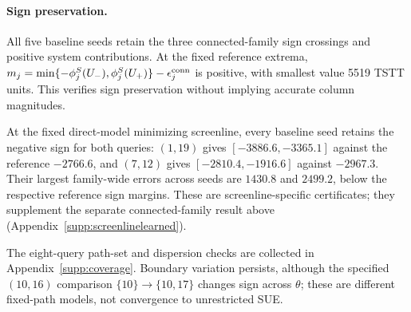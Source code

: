 \paragraph{Sign preservation.}\label{subsec:precision}
All five baseline seeds retain the three connected-family sign crossings
and positive system contributions. At the fixed reference extrema,
$m_j=\min\{-\phi_j^S(U_-),\phi_j^S(U_+)\}-\epsilon_j^{\rm conn}$
is positive, with smallest value 5519 TSTT units. This verifies sign
preservation without implying accurate column magnitudes.

At the fixed direct-model minimizing screenline, every baseline seed
retains the negative sign for both queries: $(1,19)$ gives
$[-3886.6,-3365.1]$ against the reference $-2766.6$, and $(7,12)$
gives $[-2810.4,-1916.6]$ against $-2967.3$. Their largest family-wide
errors across seeds are $1430.8$ and $2499.2$, below the respective
reference sign margins. These are screenline-specific certificates;
they supplement the separate connected-family result above
(Appendix~\ref{supp:screenlinelearned}).


The eight-query path-set and dispersion checks are collected in
Appendix~\ref{supp:coverage}. Boundary variation persists, although
the specified $(10,16)$ comparison $\{10\}\to\{10,17\}$ changes sign
across $\theta$; these are different fixed-path models, not convergence
to unrestricted SUE.

